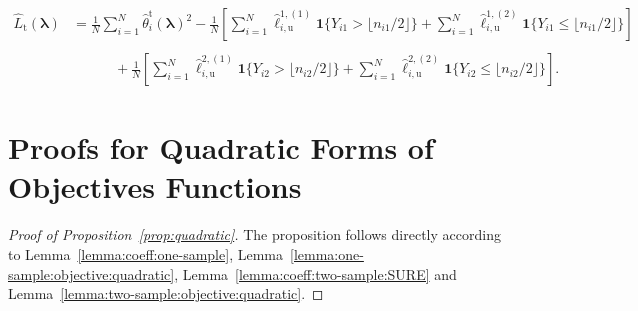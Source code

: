 \documentclass[12pt,letterpaper]{article}
\renewcommand{\u}{\mathrm{u}}
\begin{document}
\begin{equation}\label{eq:L2:risk:estimator}
\begin{array}{rl}
    \hat{L}_{\mathrm{t}}(\boldsymbol{\lambda})\!\!\!\!&=\displaystyle\frac{1}{N}\sum_{i=1}^{N}\hat{\theta}_i^{\mathrm{t}}(\boldsymbol{\lambda})^2-\frac{1}{N}\left[\sum_{i=1}^{N}\hat{\ell}_{i, \u}^{1,(1)}\mathbf{1}\{Y_{i1}>\lfloor n_{i1}/2\rfloor\}+\sum_{i=1}^{N}\hat{\ell}_{i, \u}^{1,(2)}\mathbf{1}\{Y_{i1}\leq\lfloor n_{i1}/2\rfloor\}\right]\\   
    \\
    &\displaystyle\quad\quad\quad +\frac{1}{N}\left[\sum_{i=1}^{N}\hat{\ell}_{i, \u}^{2,(1)}\mathbf{1}\{Y_{i2}>\lfloor n_{i2}/2\rfloor\}+\sum_{i=1}^{N}\hat{\ell}_{i, \u}^{2,(2)}\mathbf{1}\{Y_{i2}\leq\lfloor n_{i2}/2\rfloor\}\right].
\end{array}
\end{equation}

\section{Proofs for Quadratic Forms of Objectives Functions}
\begin{proof}[Proof of Proposition~\ref{prop:quadratic}]
The proposition follows directly according to Lemma~\ref{lemma:coeff:one-sample}, Lemma~\ref{lemma:one-sample:objective:quadratic}, Lemma~\ref{lemma:coeff:two-sample:SURE} and Lemma~\ref{lemma:two-sample:objective:quadratic}.
\end{proof}
\end{document}
